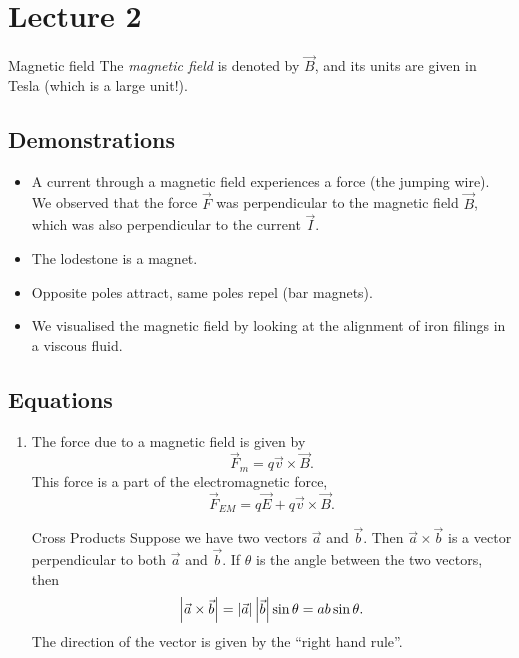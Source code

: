 \documentclass[class=article, crop=false]{standalone}
\begin{document}
  \section{Lecture 2}
  \begin{definition}{Magnetic field}
    The \emph{magnetic field} is denoted by $\vec{B}$, and its units are given in Tesla (which is a large unit!).
  \end{definition}
  \subsection{Demonstrations}
  \begin{itemize}
    \item A current through a magnetic field experiences a force (the jumping wire). We observed that the force $\vec{F}$ was perpendicular to the magnetic field $\vec{B}$, which was also perpendicular to the current $\vec{I}$.
    \item The lodestone is a magnet.
    \item Opposite poles attract, same poles repel (bar magnets).
    \item We visualised the magnetic field by looking at the alignment of iron filings in a viscous fluid.
  \end{itemize}
  \subsection{Equations}
  \begin{enumerate}
    \item The force due to a magnetic field is given by
    \[
      \vec{F}_m = q\vec{v}\times \vec{B}.
    \]
    This force is a part of the electromagnetic force, 
    \[
      \vec{F}_{EM} = q\vec{E} + q\vec{v}\times \vec{B}.
    \]
    \begin{note}{Cross Products}
      Suppose we have two vectors $\vec{a}$ and $\vec{b}$. Then $\vec{a}\times \vec{b}$ is a vector perpendicular to both $\vec{a}$ and $\vec{b}$. If $\theta$ is the angle between the two vectors, then
      \[
        \left\lvert \vec{a}\times \vec{b} \right\rvert = \left\lvert \vec{a} \right\rvert\left\lvert \vec{b} \right\rvert\sin\theta = ab\sin\theta.
      \]
      The direction of the vector is given by the ``right hand rule''.
    \end{note}
  \end{enumerate}
\end{document}
